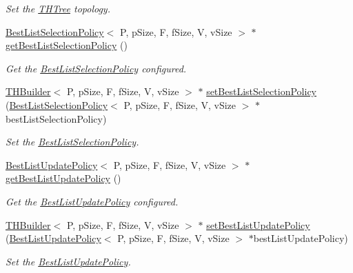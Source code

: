 \begin{DoxyCompactItemize}
\begin{DoxyCompactList}\small\item\em Set the \hyperlink{classTHTree}{T\+H\+Tree} topology. \end{DoxyCompactList}\item 
\hyperlink{classBestListSelectionPolicy}{Best\+List\+Selection\+Policy}$<$ P, p\+Size, F, f\+Size, V, v\+Size $>$ $\ast$ \hyperlink{classTHBuilder_a4ebc7b6974e1d91c6873c4e573db8121}{get\+Best\+List\+Selection\+Policy} ()
\begin{DoxyCompactList}\small\item\em Get the \hyperlink{classBestListSelectionPolicy}{Best\+List\+Selection\+Policy} configured. \end{DoxyCompactList}\item 
\hyperlink{classTHBuilder}{T\+H\+Builder}$<$ P, p\+Size, F, f\+Size, V, v\+Size $>$ $\ast$ \hyperlink{classTHBuilder_ab51929bf444ba8ba95407234b6b03aae}{set\+Best\+List\+Selection\+Policy} (\hyperlink{classBestListSelectionPolicy}{Best\+List\+Selection\+Policy}$<$ P, p\+Size, F, f\+Size, V, v\+Size $>$ $\ast$best\+List\+Selection\+Policy)
\begin{DoxyCompactList}\small\item\em Set the \hyperlink{classBestListSelectionPolicy}{Best\+List\+Selection\+Policy}. \end{DoxyCompactList}\item 
\hyperlink{classBestListUpdatePolicy}{Best\+List\+Update\+Policy}$<$ P, p\+Size, F, f\+Size, V, v\+Size $>$ $\ast$ \hyperlink{classTHBuilder_aca895af8d67060f0f66176aa18f00f98}{get\+Best\+List\+Update\+Policy} ()
\begin{DoxyCompactList}\small\item\em Get the \hyperlink{classBestListUpdatePolicy}{Best\+List\+Update\+Policy} configured. \end{DoxyCompactList}\item 
\hyperlink{classTHBuilder}{T\+H\+Builder}$<$ P, p\+Size, F, f\+Size, V, v\+Size $>$ $\ast$ \hyperlink{classTHBuilder_a6417e7c24c6b96ed051e9ea9707faa95}{set\+Best\+List\+Update\+Policy} (\hyperlink{classBestListUpdatePolicy}{Best\+List\+Update\+Policy}$<$ P, p\+Size, F, f\+Size, V, v\+Size $>$ $\ast$best\+List\+Update\+Policy)
\begin{DoxyCompactList}\small\item\em Set the \hyperlink{classBestListUpdatePolicy}{Best\+List\+Update\+Policy}. \end{DoxyCompactList}\item 

\end{DoxyCompactItemize}
